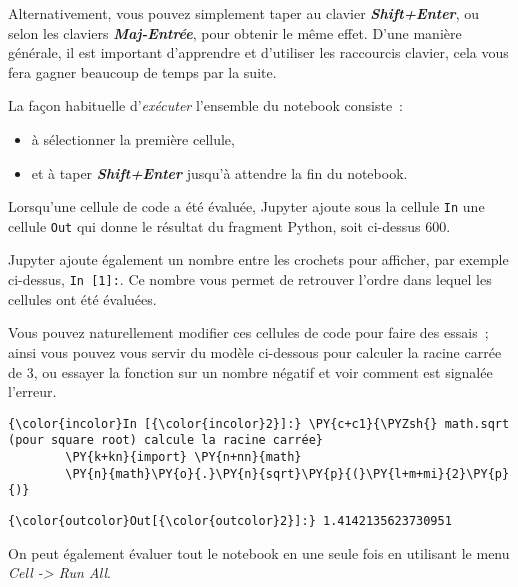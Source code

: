 Alternativement, vous pouvez simplement taper au clavier
\textbf{\emph{Shift+Enter}}, ou selon les claviers
\textbf{\emph{Maj-Entrée}}, pour obtenir le même effet. D'une manière
générale, il est important d'apprendre et d'utiliser les raccourcis
clavier, cela vous fera gagner beaucoup de temps par la suite.

    La façon habituelle d'\emph{exécuter} l'ensemble du notebook consiste~:

\begin{itemize}
\tightlist
\item
  à sélectionner la première cellule,
\item
  et à taper \textbf{\emph{Shift+Enter}} jusqu'à attendre la fin du
  notebook.
\end{itemize}

    Lorsqu'une cellule de code a été évaluée, Jupyter ajoute sous la cellule
\texttt{In} une cellule \texttt{Out} qui donne le résultat du fragment
Python, soit ci-dessus 600.

Jupyter ajoute également un nombre entre les crochets pour afficher, par
exemple ci-dessus, \texttt{In\ {[}1{]}:}. Ce nombre vous permet de
retrouver l'ordre dans lequel les cellules ont été évaluées.

    Vous pouvez naturellement modifier ces cellules de code pour faire des
essais~; ainsi vous pouvez vous servir du modèle ci-dessous pour
calculer la racine carrée de 3, ou essayer la fonction sur un nombre
négatif et voir comment est signalée l'erreur.

    \begin{Verbatim}[commandchars=\\\{\},frame=single,framerule=0.3mm,rulecolor=\color{cellframecolor}]
{\color{incolor}In [{\color{incolor}2}]:} \PY{c+c1}{\PYZsh{} math.sqrt (pour square root) calcule la racine carrée}
        \PY{k+kn}{import} \PY{n+nn}{math}
        \PY{n}{math}\PY{o}{.}\PY{n}{sqrt}\PY{p}{(}\PY{l+m+mi}{2}\PY{p}{)}
\end{Verbatim}


\begin{Verbatim}[commandchars=\\\{\},frame=single,framerule=0.3mm,rulecolor=\color{cellframecolor}]
{\color{outcolor}Out[{\color{outcolor}2}]:} 1.4142135623730951
\end{Verbatim}
            
    On peut également évaluer tout le notebook en une seule fois en
utilisant le menu \emph{Cell -\textgreater{} Run All}.

